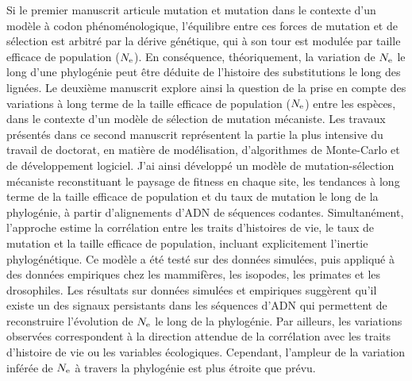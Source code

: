 Si le premier manuscrit articule mutation et mutation dans le contexte d'un modèle à codon phénoménologique, l'équilibre entre ces forces de mutation et de sélection est arbitré par la dérive génétique, qui à son tour est modulée par taille efficace de population ($N_{\textrm{e}}$).
En conséquence, théoriquement, la variation de $N_{\textrm{e}}$ le long d'une phylogénie peut être déduite de l'histoire des substitutions le long des lignées.
Le deuxième manuscrit explore ainsi la question de la prise en compte des variations à long terme de la taille efficace de population ($N_{\textrm{e}}$) entre les espèces, dans le contexte d'un modèle de sélection de mutation mécaniste.
Les travaux présentés dans ce second manuscrit représentent la partie la plus intensive du travail de doctorat, en matière de modélisation, d'algorithmes de Monte-Carlo et de développement logiciel.
J'ai ainsi développé un modèle de mutation-sélection mécaniste reconstituant le paysage de fitness en chaque site, les tendances à long terme de la taille efficace de population et du taux de mutation le long de la phylogénie, à partir d’alignements d'ADN de séquences codantes.
Simultanément, l'approche estime la corrélation entre les traits d’histoires de vie, le taux de mutation et la taille efficace de population, incluant explicitement l'inertie phylogénétique.
Ce modèle a été testé sur des données simulées, puis appliqué à des données empiriques chez les mammifères, les isopodes, les primates et les drosophiles.
Les résultats sur données simulées et empiriques suggèrent qu'il existe un des signaux persistants dans les séquences d’ADN qui permettent de reconstruire l'évolution de $N_{\textrm{e}}$ le long de la phylogénie.
Par ailleurs, les variations observées correspondent à la direction attendue de la corrélation avec les traits d’histoire de vie ou les variables écologiques.
Cependant, l'ampleur de la variation inférée de $N_{\textrm{e}}$ à travers la phylogénie est plus étroite que prévu.

